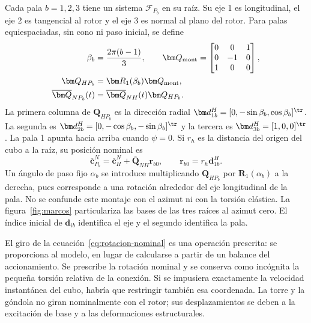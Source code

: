 Cada pala $b=1,2,3$ tiene un sistema $\mathcal F_{P_b}$ en su raíz. Su eje 1 es longitudinal, el eje 2 es tangencial al rotor y el eje 3 es normal al plano del rotor. Para palas equiespaciadas, sin cono ni paso inicial, se define
\begin{align}
\beta_b&=\frac{2\pi(b-1)}3,\qquad
\bm Q_{\rm mont}=
\begin{bmatrix}0&0&1\\0&-1&0\\1&0&0\end{bmatrix},\nonumber\\
\bm Q_{HP_b}&=\bm R_1(\beta_b)\bm Q_{\rm mont},\nonumber\\
\overline{\bm Q}_{NP_b}(t)
&=\overline{\bm Q}_{NH}(t)\bm Q_{HP_b}.
\label{eq:marcos-palas}
\end{align}
La primera columna de $\bm Q_{HP_b}$ es la dirección radial
$\bm d_{1b}^H=[0,-\sin\beta_b,\cos\beta_b]^\tr$.
La segunda es $\bm d_{2b}^H=[0,-\cos\beta_b,-\sin\beta_b]^\tr$ y la tercera es $\bm d_{3b}^H=[1,0,0]^\tr$. La pala 1 apunta hacia arriba cuando $\psi=0$. Si $r_h$ es la distancia del origen del cubo a la raíz, su posición nominal es
\begin{equation}
\overline{\bm c}_{P_b}^N
=\overline{\bm c}_H^N+\overline{\bm Q}_{NH}\bm r_{b0},
\qquad \bm r_{b0}=r_h\bm d_{1b}^H.
\label{eq:raices}
\end{equation}
Un ángulo de paso fijo $\alpha_b$ se introduce multiplicando $\bm Q_{HP_b}$ por $\bm R_1(\alpha_b)$ a la derecha, pues corresponde a una rotación alrededor del eje longitudinal de la pala. No se confunde este montaje con el azimut ni con la torsión elástica.
La figura~\ref{fig:marcos} particulariza las bases de las tres raíces al azimut cero. El índice inicial de $\bm d_{ib}$ identifica el eje y el segundo identifica la pala.




El giro de la ecuación~\eqref{eq:rotacion-nominal} es una operación prescrita: se proporciona al modelo, en lugar de calcularse a partir de un balance del accionamiento. Se prescribe la rotación nominal y se conserva como incógnita la pequeña torsión relativa de la conexión. Si se impusiera exactamente la velocidad instantánea del cubo, habría que restringir también esa coordenada. La torre y la góndola no giran nominalmente con el rotor; sus desplazamientos se deben a la excitación de base y a las deformaciones estructurales.

